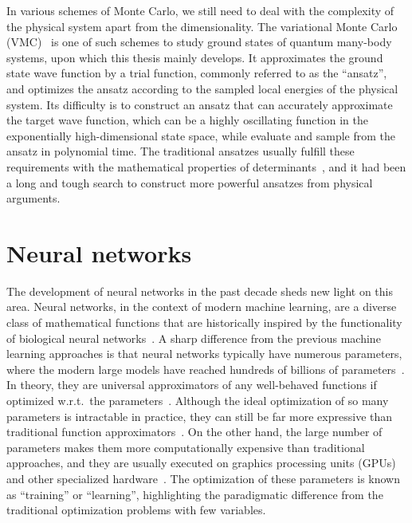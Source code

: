 In various schemes of Monte Carlo, we still need to deal with the complexity of the physical system apart from the dimensionality. The variational Monte Carlo (VMC)~\cite{scherer2017computational} is one of such schemes to study ground states of quantum many-body systems, upon which this thesis mainly develops. It approximates the ground state wave function by a trial function, commonly referred to as the ``ansatz'', and optimizes the ansatz according to the sampled local energies of the physical system. Its difficulty is to construct an ansatz that can accurately approximate the target wave function, which can be a highly oscillating function in the exponentially high-dimensional state space, while evaluate and sample from the ansatz in polynomial time. The traditional ansatzes usually fulfill these requirements with the mathematical properties of determinants~\cite{slater1929theory, bouchaud1988pair}, and it had been a long and tough search to construct more powerful ansatzes from physical arguments.

\section{Neural networks}
\label{sec:intro-ml}

The development of neural networks in the past decade sheds new light on this area. Neural networks, in the context of modern machine learning, are a diverse class of mathematical functions that are historically inspired by the functionality of biological neural networks~\cite{hopfield1982neural, mackay2003information}. A sharp difference from the previous machine learning approaches is that neural networks typically have numerous parameters, where the modern large models have reached hundreds of billions of parameters~\cite{brown2020language}. In theory, they are universal approximators of any well-behaved functions if optimized w.r.t.\ the parameters~\cite{hornik1989multilayer}. Although the ideal optimization of so many parameters is intractable in practice, they can still be far more expressive than traditional function approximators~\cite{sontag1998vc}. On the other hand, the large number of parameters makes them more computationally expensive than traditional approaches, and they are usually executed on graphics processing units (GPUs) and other specialized hardware~\cite{chen2020survey}. The optimization of these parameters is known as ``training'' or ``learning'', highlighting the paradigmatic difference from the traditional optimization problems with few variables.

